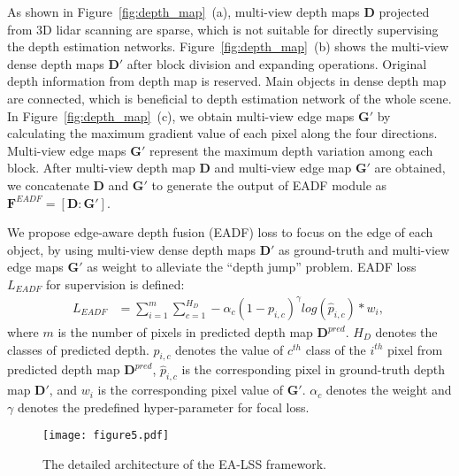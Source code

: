 \documentclass[letterpaper]{article} \usepackage[submission]{aaai24}  \usepackage{times}  \usepackage{helvet}  \usepackage{courier}  \usepackage[hyphens]{url}  \usepackage{graphicx} \urlstyle{rm} \def\UrlFont{\rm}  \usepackage{natbib}  \usepackage{caption} \frenchspacing  \setlength{\pdfpagewidth}{8.5in} \setlength{\pdfpageheight}{11in} \usepackage{algorithm}
\begin{document}
As shown in Figure~\ref{fig:depth_map}~(a), multi-view depth maps $\mathbf{D}$ projected from 3D lidar scanning are sparse, which is not suitable for directly supervising the depth estimation networks. Figure~\ref{fig:depth_map}~(b) shows the multi-view dense depth maps $\mathbf{D'}$ after block division and expanding operations. Original depth information from depth map is reserved. Main objects in dense depth map are connected, which is beneficial to depth estimation network of the whole scene. In Figure~\ref{fig:depth_map}~(c), we obtain multi-view edge maps $\mathbf{G'}$ by calculating the maximum gradient value of each pixel along the four directions. Multi-view edge maps $\mathbf{G'}$ represent the maximum depth variation among each block. 
After multi-view depth map $\mathbf{D}$ and multi-view edge map $\mathbf{G'}$ are obtained, we concatenate $\mathbf{D}$ and $\mathbf{G'}$ to generate the output of EADF module as $\mathbf{F}^{EADF}= [\mathbf{D}:\mathbf{G'}]$.

We propose edge-aware depth fusion (EADF) loss to focus on the edge of each object, by using multi-view dense depth maps $\mathbf{D'}$ as ground-truth and multi-view edge maps $\mathbf{G'}$ as weight to alleviate the ``depth jump'' problem. EADF
 loss $L_{EADF}$ for supervision is defined:
\begin{equation}
\label{eq:GEDL}
\begin{split}
L_{EADF} &= \sum_{i=1}^{m} \sum_{c=1}^{H_D} -{\alpha_c}\left ( 1-{p}_{i,c}  \right )   ^{\gamma } log\left ( \widehat{p}_{i,c}  \right ) \ast w_{i}, \
\end{split}
\end{equation}
where $m$ is the number of pixels in predicted depth map $\mathbf{D}^{pred}$. $H_D$ denotes the classes of predicted depth. ${p}_{i,c}$  denotes the value of $c^{th}$ class of the $i^{th}$ pixel from predicted depth map $\mathbf{D}^{pred}$, $\widehat{p}_{i,c}$ is  the corresponding pixel in ground-truth depth map $\mathbf{D'}$,  and $w_{i}$ is the corresponding pixel value of $\mathbf{G'}$. $\alpha_c$ denotes the weight and  $\gamma$ denotes the predefined hyper-parameter for focal loss.

\begin{figure}[t]
\begin{center}
\texttt{[image: figure5.pdf]}
\end{center}
   \caption{The detailed architecture of the EA-LSS framework.} \label{fig:depth_sem_arch}
\end{figure}
\end{document}
